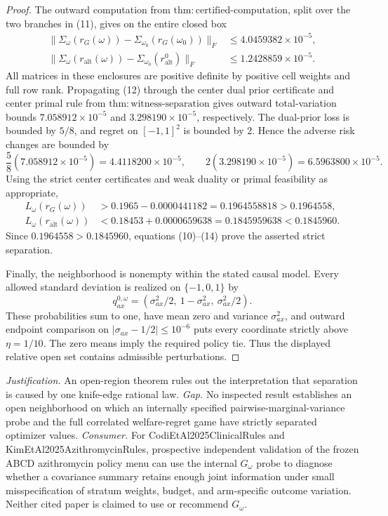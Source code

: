 \documentclass{article}
\begin{document}
\begin{proof}
The outward computation from \(\mathrm{thm:certified\text{-}computation}\), split over the two branches in (11), gives on the entire closed box
\[
 \begin{aligned}
 \lVert\Sigma_\omega(r_G(\omega))-\Sigma_{\omega_0}(r_G(\omega_0))\rVert_F
 &\leq4.0459382\times10^{-5},\\
 \lVert\Sigma_\omega(r_{\mathrm{alt}}(\omega))-
 \Sigma_{\omega_0}(r^0_{\mathrm{alt}})\rVert_F
 &\leq1.2428859\times10^{-5}.                                      \tag{12}
 \end{aligned}
\]
All matrices in these enclosures are positive definite by positive cell weights and full row rank.  Propagating (12) through the center dual prior certificate and center primal rule from \(\mathrm{thm:witness\text{-}separation}\) gives outward total-variation bounds \(7.058912\times10^{-5}\) and \(3.298190\times10^{-5}\), respectively.  The dual-prior loss is bounded by \(5/8\), and regret on \([-1,1]^2\) is bounded by \(2\).  Hence the adverse risk changes are bounded by
\[
 \frac58(7.058912\times10^{-5})=4.4118200\times10^{-5},\qquad
 2(3.298190\times10^{-5})=6.5963800\times10^{-5}.                   \tag{13}
\]
Using the strict center certificates and weak duality or primal feasibility as appropriate,
\[
 \begin{aligned}
 L_\omega(r_G(\omega))
 &>0.1965-0.0000441182=0.1964558818>0.1964558,\\
 L_\omega(r_{\mathrm{alt}}(\omega))
 &<0.18453+0.0000659638=0.1845959638<0.1845960.                     \tag{14}
 \end{aligned}
\]
Since \(0.1964558>0.1845960\), equations (10)--(14) prove the asserted strict separation.

Finally, the neighborhood is nonempty within the stated causal model.  Every allowed standard deviation is realized on \(\{-1,0,1\}\) by
\[
 q^{0,\omega}_{ax}=(\sigma_{ax}^2/2,\ 1-\sigma_{ax}^2,\ \sigma_{ax}^2/2).
\]
These probabilities sum to one, have mean zero and variance \(\sigma_{ax}^2\), and outward endpoint comparison on \(|\sigma_{ax}-1/2|\leq10^{-6}\) puts every coordinate strictly above \(\eta=1/10\).  The zero means imply the required policy tie.  Thus the displayed relative open set contains admissible perturbations.
\end{proof}
\par\smallskip\noindent \textit{Justification.} An open-region theorem rules out the interpretation that separation is caused by one knife-edge rational law. \textit{Gap.} No inspected result establishes an open neighborhood on which an internally specified pairwise-marginal-variance probe and the full correlated welfare-regret game have strictly separated optimizer values. \textit{Consumer.} For CodiEtAl2025ClinicalRules and KimEtAl2025AzithromycinRules, prospective independent validation of the frozen ABCD azithromycin policy menu can use the internal \(G_\omega\) probe to diagnose whether a covariance summary retains enough joint information under small misspecification of stratum weights, budget, and arm-specific outcome variation. Neither cited paper is claimed to use or recommend \(G_\omega\).
\end{document}
